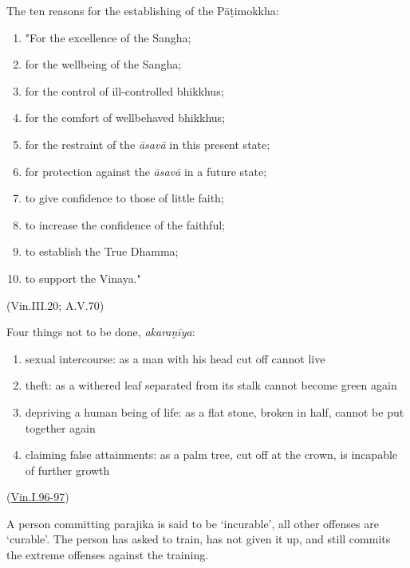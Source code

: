 \begin{multicols}{2}

The ten reasons for the establishing of the Pāṭimokkha:

\begin{enumerate}
\def\labelenumi{\arabic{enumi}.}
\tightlist
\item
  "For the excellence of the Sangha;
\item
  for the wellbeing of the Sangha;
\item
  for the control of ill-controlled bhikkhus;
\item
  for the comfort of wellbehaved bhikkhus;
\item
  for the restraint of the \emph{āsavā} in this present state;
\item
  for protection against the \emph{āsavā} in a future state;
\item
  to give confidence to those of little faith;
\item
  to increase the confidence of the faithful;
\item
  to establish the True Dhamma;
\item
  to support the Vinaya."
\end{enumerate}

(Vin.III.20; A.V.70)

\columnbreak

Four things not to be done, \emph{akaraṇīya}:

\begin{enumerate}
\def\labelenumi{\arabic{enumi}.}
\tightlist
\item
  sexual intercourse: as a man with his head cut off cannot live
\item
  theft: as a withered leaf separated from its stalk cannot become green
  again
\item
  depriving a human being of life: as a flat stone, broken in half,
  cannot be put together again
\item
  claiming false attainments: as a palm tree, cut off at the crown, is
  incapable of further growth
\end{enumerate}

(\href{https://suttacentral.net/pli-tv-kd1/en/horner-brahmali}{Vin.I.96-97})

A person committing parajika is said to be `incurable', all other
offenses are `curable'. The person has asked to train, has not given it
up, and still commits the extreme offenses against the training.

\end{multicols}
\par
\clearpage

